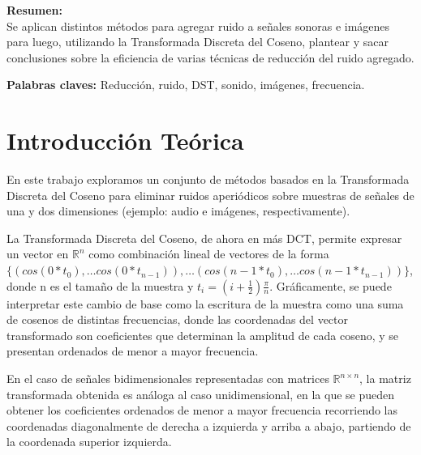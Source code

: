 \documentclass[a4paper,10pt,twoside]{article}
\begin{document}
\textbf{Resumen:} \\
Se aplican distintos métodos para agregar ruido a señales sonoras e imágenes para luego, utilizando la Transformada Discreta del Coseno, plantear y sacar conclusiones sobre la eficiencia de varias técnicas de reducción del ruido agregado.

\textbf{Palabras claves:}
Reducción, ruido, DST, sonido, imágenes, frecuencia.
\newpage




\tableofcontents

\newpage




\section{Introducción Teórica}

En este trabajo exploramos un conjunto de métodos basados en la Transformada Discreta del Coseno para eliminar ruidos aperiódicos sobre muestras de señales de una y dos dimensiones (ejemplo: audio e imágenes, respectivamente).

La Transformada Discreta del Coseno, de ahora en más DCT, permite expresar un vector en $\mathbb{R}^n$ como combinación lineal de vectores de la forma $\{(cos(0 * t_0), \ldots cos(0 * t_{n-1})), \ldots (cos(n-1 * t_0), \ldots cos(n-1 * t_{n-1})) \}$, donde n es el tamaño de la muestra y $t_i = (i + \frac{1}{2})\frac{\pi}{n}$. Gráficamente, se puede interpretar este cambio de base como la escritura de la muestra como una suma de cosenos de distintas frecuencias, donde las coordenadas del vector transformado son coeficientes que determinan la amplitud de cada coseno, y se presentan ordenados de menor a mayor frecuencia.

En el caso de señales bidimensionales representadas con matrices $\mathbb{R}^{n \times n}$, la matriz transformada obtenida es análoga al caso unidimensional, en la que se pueden obtener los coeficientes ordenados de menor a mayor frecuencia recorriendo las coordenadas diagonalmente de derecha a izquierda y arriba a abajo, partiendo de la coordenada superior izquierda.
\end{document}
